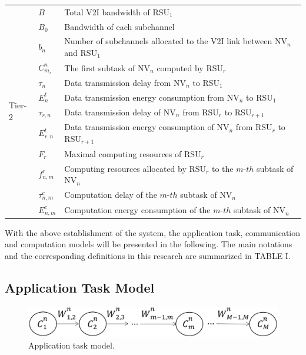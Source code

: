 \documentclass[lettersize,journal]{IEEEtran}
\begin{document}
\begin{table}[!t]
\begin{tabular}{|m{1.0cm}<{\centering}|m{1.0cm}<{\centering}|m{5.6cm}<{\centering}|}
\hline
\multirow{18}{*}{Tier-2} & $B$ & Total V2I bandwidth of RSU$_1$\\
\cline{2-3} &
$B_0$ & Bandwidth of each subchannel\\
\cline{2-3} &
$b_n$ & Number of subchannels allocated to the V2I link between NV$_n$ and RSU$_1$\\
\cline{2-3} &
$C^n_{m_r}$ & The first subtask of NV$_n$ computed by RSU$_r$\\
\cline{2-3} &
$\tau_{n}$ & Data transmission delay from NV$_n$ to RSU$_1$\\
\cline{2-3} &
$E^t_{n}$ & Data transmission energy consumption from NV$_n$ to RSU$_1$\\
\cline{2-3} &
$\tau_{r,n}$ & Data transmission delay of NV$_n$ from RSU$_r$ to RSU$_{r+1}$\\
\cline{2-3} &
$E^t_{r,n}$ & Data transmission energy consumption of NV$_n$ from RSU$_r$ to RSU$_{r+1}$\\
\cline{2-3} &
$F_r$ & Maximal computing resources of RSU$_r$\\
\cline{2-3} &
$f^r_{n,m}$ & Computing resources allocated by RSU$_r$ to the $m\mbox{-}th$ subtask of NV$_n$\\
\cline{2-3} &
$\tau^c_{n,m}$ & Computation delay of the $m\mbox{-}th$ subtask of NV$_n$\\
\cline{2-3} &
$E^{c}_{n,m}$ & Computation energy consumption of the $m\mbox{-}th$ subtask of NV$_n$\\
\hline

\end{tabular}
\end{table}


With the above establishment of the system, the application task, communication and computation models will be presented in the following. The main notations and the corresponding definitions in this research are summarized in TABLE I.


\subsection{Application Task Model}

\begin{figure}[h]
\centering
\includegraphics[width=3.3 in]{Figures/Task_Model_R4.png}
\caption{Application task model.}
\label{fig_2}
\end{figure}
\end{document}
